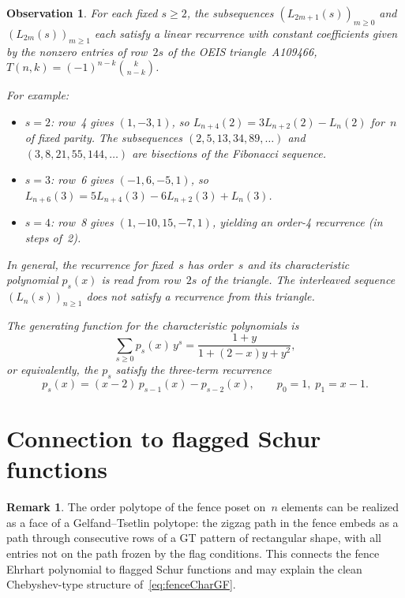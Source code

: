\documentclass[11pt,reqno]{amsart}
\newtheorem{observation}[theorem]{Observation}
\theoremstyle{definition}
\newtheorem{remark}[theorem]{Remark}
\begin{document}
\begin{observation}\label{obs:fenceRecurrence}
For each fixed $s \geq 2$, the subsequences
$(L_{2m+1}(s))_{m \geq 0}$ and $(L_{2m}(s))_{m \geq 1}$
each satisfy a linear recurrence with constant coefficients
given by the nonzero entries of row~$2s$ of the OEIS
triangle~A109466, $T(n,k) = (-1)^{n-k} \binom{k}{n-k}$.

For example:
\begin{itemize}
\item $s=2$: row~4 gives $(1, -3, 1)$, so
  $L_{n+4}(2) = 3 L_{n+2}(2) - L_n(2)$
  for~$n$ of fixed parity.
  The subsequences $(2, 5, 13, 34, 89, \dotsc)$ and
  $(3, 8, 21, 55, 144, \dotsc)$ are bisections of
  the Fibonacci sequence.
\item $s=3$: row~6 gives $(-1, 6, -5, 1)$, so
  $L_{n+6}(3) = 5 L_{n+4}(3) - 6 L_{n+2}(3) + L_n(3)$.
\item $s=4$: row~8 gives $(1, -10, 15, -7, 1)$, yielding an
  order-4 recurrence (in steps of~2).
\end{itemize}
In general, the recurrence for fixed~$s$ has order~$s$
and its characteristic polynomial $p_s(x)$ is read from row~$2s$
of the triangle.
The interleaved sequence $(L_n(s))_{n \geq 1}$
does not satisfy a recurrence from this triangle.

The generating function for the characteristic polynomials is
\begin{equation}\label{eq:fenceCharGF}
  \sum_{s \geq 0} p_s(x)\, y^s
  = \frac{1+y}{1 + (2-x)y + y^2},
\end{equation}
or equivalently, the $p_s$ satisfy the three-term recurrence
\[
  p_s(x) = (x-2)\, p_{s-1}(x) - p_{s-2}(x),
  \qquad p_0 = 1,\; p_1 = x - 1.
\]
\end{observation}


\section{Connection to flagged Schur functions}\label{sec:flagged}

\begin{remark}\label{rem:fenceFlaggedSchur}
The order polytope of the fence poset on~$n$ elements
can be realized as a face of a Gelfand--Tsetlin polytope:
the zigzag path in the fence embeds as a path through
consecutive rows of a GT pattern of rectangular shape,
with all entries not on the path frozen by the flag
conditions.  This connects the fence Ehrhart polynomial
to flagged Schur functions and may explain the clean
Chebyshev-type structure of~\eqref{eq:fenceCharGF}.
\end{remark}
\end{document}
